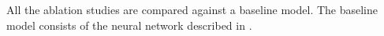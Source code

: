 
All the ablation studies are compared against a baseline
model. The baseline model consists of the neural network
described in .
